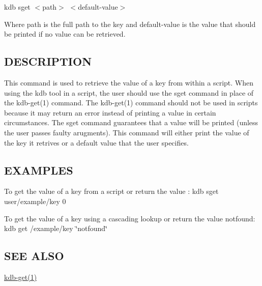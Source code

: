 {\ttfamily kdb sget $<$path$>$ $<$default-\/value$>$}

Where {\ttfamily path} is the full path to the key and {\ttfamily default-\/value} is the value that should be printed if no value can be retrieved.

\subsection*{D\+E\+S\+C\+R\+I\+P\+T\+I\+O\+N}

This command is used to retrieve the value of a key from within a script. When using the kdb tool in a script, the user should use the {\ttfamily sget} command in place of the kdb-\/get(1) command. The kdb-\/get(1) command should not be used in scripts because it may return an error instead of printing a value in certain circumstances. The {\ttfamily sget} command guarantees that a value will be printed (unless the user passes faulty arugments). This command will either print the value of the key it retrives or a default value that the user specifies.

\subsection*{E\+X\+A\+M\+P\+L\+E\+S}

To get the value of a key from a script or return the value {}\+: {\ttfamily kdb sget user/example/key 0}

To get the value of a key using a cascading lookup or return the value {\ttfamily notfound}\+: {\ttfamily kdb get /example/key \char`\"{}notfound\char`\"{}}

\subsection*{S\+E\+E A\+L\+S\+O}


\begin{DoxyItemize}
\item \hyperlink{md_doc_help_kdb-get_doc_help_kdb-get_md}{kdb-\/get(1)} 
\end{DoxyItemize}